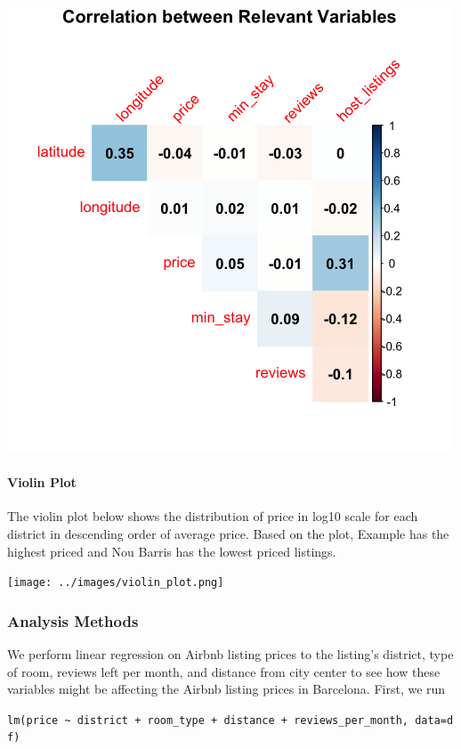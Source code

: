 \documentclass[]{article}
\let\oldparagraph\paragraph
\renewcommand{\paragraph}[1]{\oldparagraph{#1}\mbox{}}
\begin{document}
\includegraphics[width=5.20833in,height=\textheight]{../images/correlogram.png}

\hypertarget{violin-plot}{%
\paragraph{Violin Plot}\label{violin-plot}}

The violin plot below shows the distribution of price in log10 scale for
each district in descending order of average price. Based on the plot,
Example has the highest priced and Nou Barris has the lowest priced
listings.

\texttt{[image: ../images/violin\_plot.png]}

\hypertarget{analysis-methods}{%
\subsubsection{Analysis Methods}\label{analysis-methods}}

We perform linear regression on Airbnb listing prices to the listing's
district, type of room, reviews left per month, and distance from city
center to see how these variables might be affecting the Airbnb listing
prices in Barcelona. First, we run

\texttt{lm(price\ \textasciitilde{}\ district\ +\ room\_type\ +\ distance\ +\ reviews\_per\_month,\ data=df)}
\end{document}
